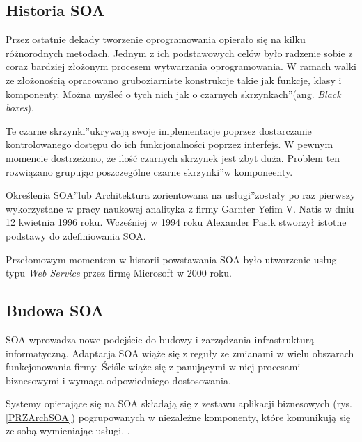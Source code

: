 \subsection{Historia SOA}
Przez ostatnie dekady tworzenie oprogramowania opierało się na kilku różnorodnych metodach. Jednym z ich podstawowych celów było radzenie sobie z coraz bardziej złożonym procesem wytwarzania oprogramowania. W ramach walki ze złożonością opracowano gruboziarniste konstrukcje takie jak funkcje, klasy i komponenty. Można myśleć o tych nich jak o \quotedblbase czarnych skrzynkach\textquotedblright (ang. \emph{Black boxes}). 

Te \quotedblbase czarne skrzynki\textquotedblright ukrywają swoje implementacje poprzez dostarczanie kontrolowanego dostępu do ich funkcjonalności poprzez interfejs. W pewnym momencie dostrzeżono, że ilość czarnych skrzynek jest zbyt duża. Problem ten rozwiązano grupując poszczególne \quotedblbase czarne skrzynki\textquotedblright w komponeenty. \cite{SteveMichSOA} 

Określenia \quotedblbase SOA\textquotedblright  lub \quotedblbase Architektura zorientowana na usługi\textquotedblright zostały po raz pierwszy wykorzystane w pracy naukowej analityka z firmy Garnter Yefim V. Natis w dniu 12 kwietnia 1996 roku. Wcześniej w 1994 roku Alexander Pasik stworzył istotne podstawy do zdefiniowania SOA. 

Przełomowym momentem w historii powstawania SOA było utworzenie usług typu \emph{Web Service} przez firmę Microsoft w 2000 roku. \cite{JosSOAHist}

\subsection{Budowa SOA}
SOA wprowadza nowe podejście do budowy i zarządzania infrastrukturą informatyczną. Adaptacja SOA wiąże się z reguły ze zmianami w wielu obszarach funkcjonowania firmy. Ściśle wiąże się z panującymi w niej procesami biznesowymi i wymaga odpowiedniego dostosowania.

Systemy opierające się na SOA składają się z zestawu aplikacji biznesowych (rys. \ref{PRZArchSOA}) pogrupowanych w niezależne komponenty, które komunikują się ze sobą wymieniając usługi. \cite{SOAwJBBC}. 

